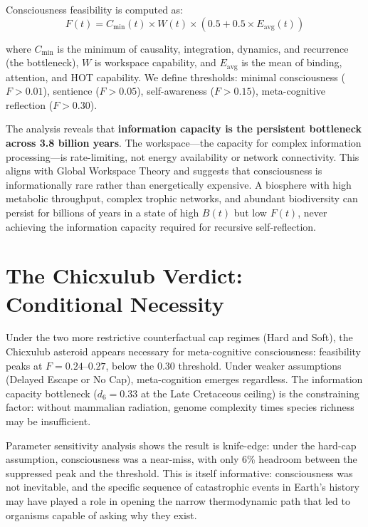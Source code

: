 Consciousness feasibility is computed as:
\begin{equation}
F(t) = C_\text{min}(t) \times W(t) \times (0.5 + 0.5 \times E_\text{avg}(t))
\end{equation}

where $C_\text{min}$ is the minimum of causality, integration, dynamics, and recurrence (the bottleneck), $W$ is workspace capability, and $E_\text{avg}$ is the mean of binding, attention, and HOT capability. We define thresholds: minimal consciousness ($F > 0.01$), sentience ($F > 0.05$), self-awareness ($F > 0.15$), meta-cognitive reflection ($F > 0.30$).

The analysis reveals that \textbf{information capacity is the persistent bottleneck across 3.8 billion years}. The workspace---the capacity for complex information processing---is rate-limiting, not energy availability or network connectivity. This aligns with Global Workspace Theory and suggests that consciousness is informationally rare rather than energetically expensive. A biosphere with high metabolic throughput, complex trophic networks, and abundant biodiversity can persist for billions of years in a state of high $B(t)$ but low $F(t)$, never achieving the information capacity required for recursive self-reflection.

\section{The Chicxulub Verdict: Conditional Necessity}

Under the two more restrictive counterfactual cap regimes (Hard and Soft), the Chicxulub asteroid appears necessary for meta-cognitive consciousness: feasibility peaks at $F = 0.24$--$0.27$, below the 0.30 threshold. Under weaker assumptions (Delayed Escape or No Cap), meta-cognition emerges regardless. The information capacity bottleneck ($d_6 = 0.33$ at the Late Cretaceous ceiling) is the constraining factor: without mammalian radiation, genome complexity times species richness may be insufficient.

Parameter sensitivity analysis shows the result is knife-edge: under the hard-cap assumption, consciousness was a near-miss, with only 6\% headroom between the suppressed peak and the threshold. This is itself informative: consciousness was not inevitable, and the specific sequence of catastrophic events in Earth's history may have played a role in opening the narrow thermodynamic path that led to organisms capable of asking why they exist.

